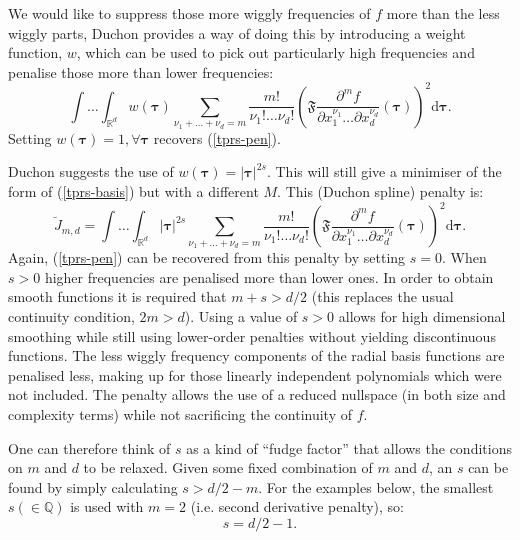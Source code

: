 \documentclass[useAMS, referee]{biom}
\begin{document}
We would like to suppress those more wiggly frequencies of $f$ more than the less wiggly parts, Duchon provides a way of doing this by introducing a weight function, $w$, which  can be used to pick out particularly high frequencies and penalise those more than lower frequencies:
\begin{equation}
\int \ldots \int_{\mathbb{R}^d} w(\boldsymbol{\tau}) \sum_{\nu_1 + \dots + \nu_d=m} \frac{m!}{\nu_1! \dots \nu_d!} \left ( \mathfrak{F} \frac{\partial^m f}{\partial x_1^{\nu_1} \ldots  \partial x_d^{\nu_d}} \left (\boldsymbol{\tau} \right ) \right )^2 \text{d} \boldsymbol{\tau}.
\label{duchon-penalty-general}
\end{equation}
Setting $w(\boldsymbol{\tau})=1, \forall \boldsymbol{\tau}$ recovers (\ref{tprs-pen}).

Duchon suggests the use of $w(\boldsymbol{\tau})= \lvert \boldsymbol{\tau} \rvert^{2s}$. This will still give a minimiser of the form of (\ref{tprs-basis}) but with a different $M$. This (Duchon spline) penalty is:
\begin{equation}
\breve{J}_{m,d} = \int \ldots \int_{\mathbb{R}^d} \lvert \boldsymbol{\tau} \rvert^{2s} \sum_{\nu_1 + \dots + \nu_d=m} \frac{m!}{\nu_1! \dots \nu_d!}\left ( \mathfrak{F} \frac{\partial^m f}{\partial x_1^{\nu_1} \ldots  \partial x_d^{\nu_d}} \left (\boldsymbol{\tau} \right ) \right )^2 \text{d} \boldsymbol{\tau}.
\label{duchon-penalty}
\end{equation}
Again, (\ref{tprs-pen}) can be recovered from this penalty by setting $s=0$. When $s>0$ higher frequencies are penalised more than lower ones. In order to obtain smooth functions it is required that $m+s>d/2$ (this replaces the usual continuity condition, $2m>d$). Using a value of $s>0$ allows for high dimensional smoothing while still using lower-order penalties without yielding discontinuous functions. The less wiggly frequency components of the radial basis functions are penalised less, making up for those linearly independent polynomials which were not included. The penalty allows the use of a reduced nullspace (in both size and complexity terms) while not sacrificing the continuity of $f$. 

One can therefore think of $s$ as a kind of ``fudge factor'' that allows the conditions on $m$ and $d$ to be relaxed. Given some fixed combination of $m$ and $d$, an $s$ can be found by simply calculating $s>d/2-m$. For the examples below, the smallest $s(\in \mathbb{Q})$ is used with $m=2$ (i.e. second derivative penalty), so:
\begin{equation}
s=d/2-1.
\label{duchon-s-eqn2}
\end{equation}
\end{document}
